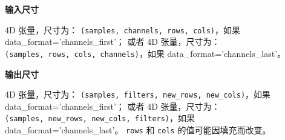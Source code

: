 \textbf{输入尺寸}

4D 张量，尺寸为： \texttt{(samples,\ channels,\ rows,\ cols)}，如果
data\_format='channels\_first'； 或者 4D 张量，尺寸为：
\texttt{(samples,\ rows,\ cols,\ channels)}，如果
data\_format='channels\_last'。

\textbf{输出尺寸}

4D 张量，尺寸为：
\texttt{(samples,\ filters,\ new\_rows,\ new\_cols)}，如果
data\_format='channels\_first'； 或者 4D 张量，尺寸为：
\texttt{(samples,\ new\_rows,\ new\_cols,\ filters)}，如果
data\_format='channels\_last'。 \texttt{rows} 和 \texttt{cols}
的值可能因填充而改变。

\newpage